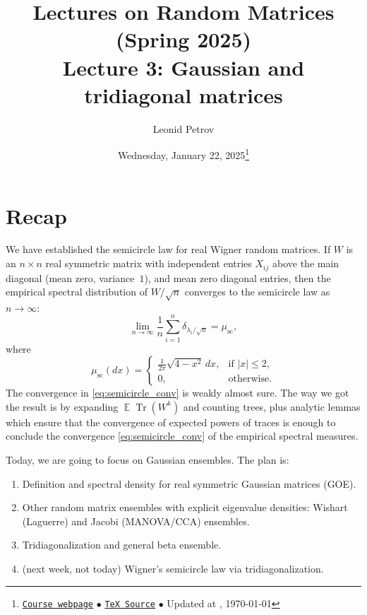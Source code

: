 \documentclass[letterpaper,11pt,oneside,reqno]{article}
\numberwithin{equation}{section}
\theoremstyle{definition}
\begin{document}
\title{Lectures on Random Matrices
(Spring 2025)
\\Lecture 3: Gaussian and tridiagonal matrices}


\date{Wednesday, January 22, 2025\footnote{\href{https://lpetrov.cc/rmt25/}{\texttt{Course webpage}}
$\bullet$ \href{https://lpetrov.cc/rmt25/rmt25-notes/rmt2025-l03.tex}{\texttt{TeX Source}}
$\bullet$
Updated at \currenttime, \today}}

\author{Leonid Petrov}


\maketitle


\tableofcontents




\section{Recap}

We have established the semicircle law for
real Wigner random matrices.
If $W$ is an $n\times n$ real symmetric matrix with
independent entries $X_{ij}$ above the main diagonal
(mean zero, variance~$1$), and mean zero diagonal entries,
then the empirical spectral distribution of $W/\sqrt{n}$
converges to the semicircle law as $n\to\infty$:
\begin{equation}
	\label{eq:semicircle_conv}
	\lim_{n\to\infty} \frac{1}{n} \sum_{i=1}^n \delta_{\lambda_i/\sqrt n} =
	\mu_{\mathrm{sc}},
\end{equation}
where
\begin{equation*}
	\mu_{\mathrm{sc}}(dx) = \begin{cases}
		\frac{1}{2\pi} \sqrt{4-x^2} \, dx, & \text{if } |x|\le 2, \\
		0, & \text{otherwise}.
	\end{cases}
\end{equation*}
The convergence
in \eqref{eq:semicircle_conv} is weakly almost sure.
The way we got the result is by expanding
$\operatorname{\mathbb{E}}\operatorname{Tr} (W^k)$ and counting
trees, plus analytic lemmas which ensure that
the convergence of expected powers of traces is enough
to conclude the convergence
\eqref{eq:semicircle_conv}
of the empirical spectral measures.

\medskip

Today, we are going to focus on Gaussian ensembles. The plan is:
\begin{enumerate}[$\bullet$]
	\item Definition and spectral density for real symmetric Gaussian matrices (GOE).
	\item Other random matrix ensembles with explicit eigenvalue densities:
		Wishart (Laguerre) and Jacobi (MANOVA/CCA) ensembles.
	\item Tridiagonalization and general beta ensemble.
	\item (next week, not today) Wigner's semicircle law via tridiagonalization.
\end{enumerate}
\end{document}
